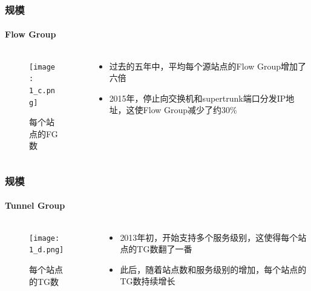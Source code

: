 \begin{frame}
    \frametitle{规模}
    \framesubtitle{Flow Group}
    \begin{columns}
        \begin{column}{0.4\textwidth}
            \begin{figure}
                \centering
                \texttt{[image: 1\_c.png]}
                \caption{每个站点的FG数}
            \end{figure}
        \end{column}

        \begin{column}{0.6\textwidth}
            \begin{itemize}
                \item 过去的五年中，平均每个源站点的Flow Group增加了六倍
                \item 2015年，停止向交换机和supertrunk端口分发IP地址，这使Flow Group减少了约30\%
            \end{itemize}
        \end{column}
    \end{columns}
\end{frame}

\begin{frame}
    \frametitle{规模}
    \framesubtitle{Tunnel Group}
    \begin{columns}
        \begin{column}{0.4\textwidth}
            \begin{figure}
                \centering
                \texttt{[image: 1\_d.png]}
                \caption{每个站点的TG数}
            \end{figure}
        \end{column}

        \begin{column}{0.6\textwidth}
            \begin{itemize}
                \item 2013年初，开始支持多个服务级别，这使得每个站点的TG数翻了一番
                \item 此后，随着站点数和服务级别的增加，每个站点的TG数持续增长
            \end{itemize}
        \end{column}
    \end{columns}
\end{frame}

